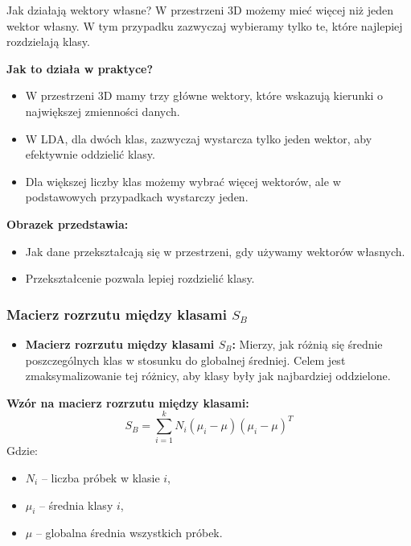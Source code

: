 \documentclass{beamer}
\begin{document}
\begin{frame}{Jak działają wektory własne?}
    W przestrzeni 3D możemy mieć więcej niż jeden wektor własny. W tym przypadku zazwyczaj wybieramy tylko te, które najlepiej rozdzielają klasy.

    \bigskip
    \textbf{Jak to działa w praktyce?}  
    \begin{itemize}
        \item W przestrzeni 3D mamy trzy główne wektory, które wskazują kierunki o największej zmienności danych.
        \item W LDA, dla dwóch klas, zazwyczaj wystarcza tylko jeden wektor, aby efektywnie oddzielić klasy.
        \item Dla większej liczby klas możemy wybrać więcej wektorów, ale w podstawowych przypadkach wystarczy jeden.
    \end{itemize}

    \bigskip
    \textbf{Obrazek przedstawia:}
    \begin{itemize}
        \item Jak dane przekształcają się w przestrzeni, gdy używamy wektorów własnych.
        \item Przekształcenie pozwala lepiej rozdzielić klasy.
    \end{itemize}

\end{frame}





\begin{frame}
    \frametitle{Macierz rozrzutu między klasami \( S_B \)}

    \begin{itemize}
        \item \textbf{Macierz rozrzutu między klasami \( S_B \):}  
        Mierzy, jak różnią się średnie poszczególnych klas w stosunku do globalnej średniej. Celem jest zmaksymalizowanie tej różnicy, aby klasy były jak najbardziej oddzielone.
    \end{itemize}

    \bigskip
    \textbf{Wzór na macierz rozrzutu między klasami:}
    \[
    S_B = \sum_{i=1}^{k} N_i (\mu_i - \mu)(\mu_i - \mu)^T
    \]
    Gdzie:
    \begin{itemize}
        \item \( N_i \) – liczba próbek w klasie \( i \),
        \item \( \mu_i \) – średnia klasy \( i \),
        \item \( \mu \) – globalna średnia wszystkich próbek.
    \end{itemize}
\end{frame}
\end{document}
